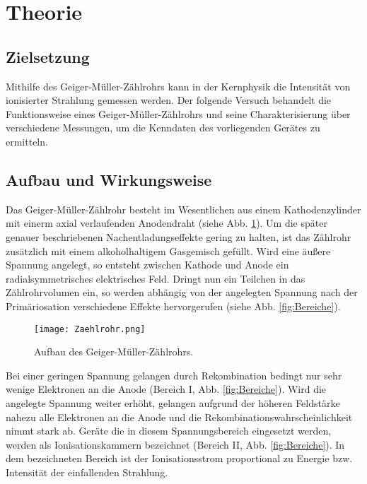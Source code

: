 \section{Theorie}

\subsection{Zielsetzung}

Mithilfe des Geiger-Müller-Zählrohrs kann in der Kernphysik die Intensität von
ionisierter Strahlung gemessen werden. Der folgende Versuch behandelt
die Funktionsweise eines Geiger-Müller-Zählrohrs und seine Charakterisierung
über verschiedene Messungen, um die Kenndaten des vorliegenden Gerätes zu ermitteln.

\subsection{Aufbau und Wirkungsweise}

Das Geiger-Müller-Zählrohr besteht im Wesentlichen aus einem Kathodenzylinder
mit einerm axial verlaufenden Anodendraht (siehe Abb. \ref{fig:Geiger}). Um die
später genauer beschriebenen Nachentladungseffekte gering zu halten, ist das
Zählrohr zusätzlich mit einem alkoholhaltigem Gasgemisch gefüllt. Wird eine
äußere Spannung angelegt, so entsteht zwischen Kathode und Anode ein
radialsymmetrisches elektrisches Feld. Dringt nun ein Teilchen in das Zählrohrvolumen ein,
so werden abhängig von der angelegten Spannung nach der Primäriosation
verschiedene Effekte hervorgerufen (siehe Abb. \ref{fig:Bereiche}).

\begin{figure}
  \centering
  \texttt{[image: Zaehlrohr.png]}
  \caption{Aufbau des Geiger-Müller-Zählrohrs. \cite{anleitung01}}
  \label{fig:Geiger}
\end{figure}

Bei einer geringen Spannung gelangen durch Rekombination bedingt nur sehr
wenige Elektronen an die Anode (Bereich I, Abb. \ref{fig:Bereiche}). Wird die
angelegte Spannung weiter erhöht, gelangen aufgrund der höheren Feldstärke nahezu
alle Elektronen an die Anode und die Rekombinationswahrscheinlichkeit nimmt
stark ab. Geräte die in diesem Spannungsbereich eingesetzt werden, werden als
Ionisationskammern bezeichnet (Bereich II, Abb. \ref{fig:Bereiche}).
In dem bezeichneten Bereich ist der Ionisationsstrom proportional zu Energie bzw.
Intensität der einfallenden Strahlung.


